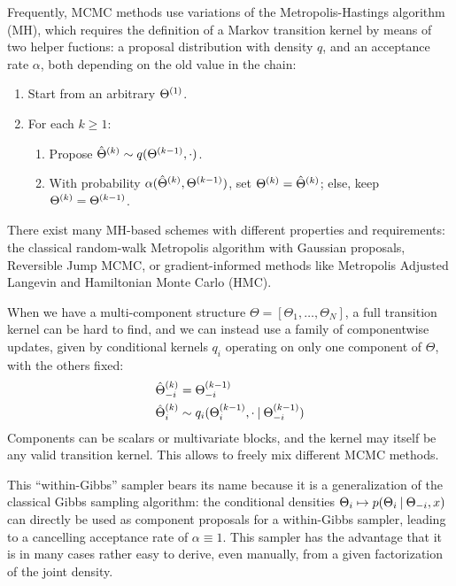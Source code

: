 Frequently, MCMC methods use variations of the Metropolis-Hastings algorithm (MH), which requires the
definition of a Markov transition kernel by means of two helper fuctions: a proposal distribution
with density \(q\), and an acceptance rate \(\alpha\), both depending on the old value in the
chain:
\begin{enumerate}
\item Start from an arbitrary \(\kth[1]{\Theta}\).
\item For each \(k \ge 1\):
  \begin{enumerate}
  \item Propose \(\kth[k]{\hat{\Theta}} \sim q(\kth[k-1]{\Theta}, \cdot)\).
  \item With probability \(\alpha(\kth[k]{\hat{\Theta}}, \kth[k-1]{\Theta})\), set
    \(\kth[k]{\Theta} = \kth[k]{\hat{\Theta}}\); else, keep \(\kth[k]{\Theta} = \kth[k-1]{\Theta}\).
  \end{enumerate}
\end{enumerate}

There exist many MH-based schemes with different properties and requirements: the classical
random-walk Metropolis algorithm with Gaussian proposals, Reversible Jump MCMC, or gradient-informed
methods like Metropolis Adjusted Langevin and Hamiltonian Monte Carlo (HMC).

When we have a multi-component structure \(\Theta = [\Theta_1, \ldots, \Theta_N]\), a full
transition kernel can be hard to find, and we can instead use a family of componentwise updates,
given by conditional kernels \(q_{i}\) operating on only one component of \(\Theta\), with the
others fixed:
\begin{equation}
  \label{eq:conditional-kernels}
  \begin{aligned}
    \kth[k]{\hat{\Theta}}_{-i} &= \kth[k-1]{\Theta}_{-i} \\
    \kth[k]{\hat{\Theta}}_{i} &\sim q_{i}(\kth[k-1]{\Theta}_{i}, \cdot \given \kth[k-1]{\Theta}_{-i})
  \end{aligned}
\end{equation}
Components can be scalars or multivariate blocks, and the kernel may itself be any valid transition
kernel.  This allows to freely mix different MCMC methods.

This \enquote{within-Gibbs} sampler bears its name because it is a generalization of the classical
Gibbs sampling algorithm: the conditional densities
\(\Theta_{i} \mapsto p(\Theta_{i} \given \Theta_{-i}, x)\) can directly be used as component
proposals for a within-Gibbs sampler, leading to a cancelling acceptance rate of
\(\alpha \equiv 1\).  This sampler has the advantage that it is in many cases rather easy to derive,
even manually, from a given factorization of the joint density.


